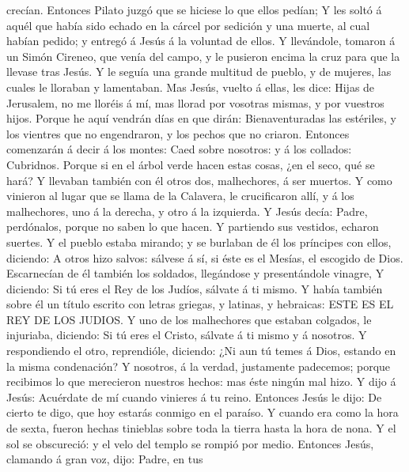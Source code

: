 crecían.  Entonces Pilato juzgó que se hiciese lo que ellos
pedían;  Y les soltó á aquél que había sido echado en la
cárcel por sedición y una muerte, al cual habían pedido; y entregó á
Jesús á la voluntad de ellos.  Y llevándole, tomaron á un
Simón Cireneo, que venía del campo, y le pusieron encima la cruz para
que la llevase tras Jesús.  Y le seguía una grande multitud
de pueblo, y de mujeres, las cuales le lloraban y lamentaban.
 Mas Jesús, vuelto á ellas, les dice: Hijas de Jerusalem,
no me lloréis á mí, mas llorad por vosotras mismas, y por vuestros
hijos.  Porque he aquí vendrán días en que dirán:
Bienaventuradas las estériles, y los vientres que no engendraron, y los
pechos que no criaron.  Entonces comenzarán á decir á los
montes: Caed sobre nosotros: y á los collados: Cubridnos. 
Porque si en el árbol verde hacen estas cosas, ¿en el seco, qué se hará?
 Y llevaban también con él otros dos, malhechores, á ser
muertos.  Y como vinieron al lugar que se llama de la
Calavera, le crucificaron allí, y á los malhechores, uno á la derecha, y
otro á la izquierda.  Y Jesús decía: Padre, perdónalos,
porque no saben lo que hacen. Y partiendo sus vestidos, echaron suertes.
 Y el pueblo estaba mirando; y se burlaban de él los
príncipes con ellos, diciendo: A otros hizo salvos: sálvese á sí, si
éste es el Mesías, el escogido de Dios.  Escarnecían de él
también los soldados, llegándose y presentándole vinagre, 
Y diciendo: Si tú eres el Rey de los Judíos, sálvate á ti mismo.
 Y había también sobre él un título escrito con letras
griegas, y latinas, y hebraicas: ESTE ES EL REY DE LOS JUDIOS.
 Y uno de los malhechores que estaban colgados, le
injuriaba, diciendo: Si tú eres el Cristo, sálvate á ti mismo y á
nosotros.  Y respondiendo el otro, reprendióle, diciendo:
¿Ni aun tú temes á Dios, estando en la misma condenación? 
Y nosotros, á la verdad, justamente padecemos; porque recibimos lo que
merecieron nuestros hechos: mas éste ningún mal hizo.  Y
dijo á Jesús: Acuérdate de mí cuando vinieres á tu reino. 
Entonces Jesús le dijo: De cierto te digo, que hoy estarás conmigo en el
paraíso.  Y cuando era como la hora de sexta, fueron hechas
tinieblas sobre toda la tierra hasta la hora de nona.  Y el
sol se obscureció: y el velo del templo se rompió por medio.
 Entonces Jesús, clamando á gran voz, dijo: Padre, en tus
